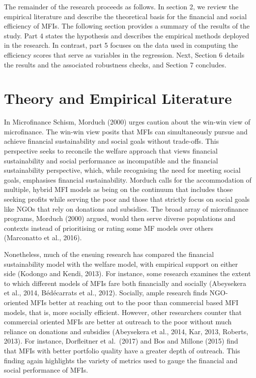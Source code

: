 \documentclass[
]{article}
\begin{document}
The remainder of the research proceeds as follows. In section 2, we
review the empirical literature and describe the theoretical basis for
the financial and social efficiency of MFIs. The following section
provides a summary of the results of the study. Part 4 states the
hypothesis and describes the empirical methods deployed in the research.
In contrast, part 5 focuses on the data used in computing the efficiency
scores that serve as variables in the regression. Next, Section 6
details the results and the associated robustness checks, and Section 7
concludes.

\hypertarget{theory-and-empirical-literature}{%
\section{Theory and Empirical
Literature}\label{theory-and-empirical-literature}}

In Microfinance Schism, Morduch (2000) urges caution about the win-win
view of microfinance. The win-win view posits that MFIs can
simultaneously pursue and achieve financial sustainability and social
goals without trade-offs. This perspective seeks to reconcile the
welfare approach that views financial sustainability and social
performance as incompatible and the financial sustainability
perspective, which, while recognising the need for meeting social goals,
emphasises financial sustainability. Morduch calls for the accommodation
of multiple, hybrid MFI models as being on the continuum that includes
those seeking profits while serving the poor and those that strictly
focus on social goals like NGOs that rely on donations and subsidies.
The broad array of microfinance programs, Morduch (2000) argued, would
then serve diverse populations and contexts instead of prioritising or
rating some MF models over others (Marconatto et al., 2016).

Nonetheless, much of the ensuing research has compared the financial
sustainability model with the welfare model, with empirical support on
either side (Kodongo and Kendi, 2013). For instance, some research
examines the extent to which different models of MFIs fare both
financially and socially (Abeysekera et al., 2014, Bédécarrats et al.,
2012). Socially, ample research finds NGO-oriented MFIs better at
reaching out to the poor than commercial based MFI models, that is, more
socially efficient. However, other researchers counter that commercial
oriented MFIs are better at outreach to the poor without much reliance
on donations and subsidies (Abeysekera et al., 2014, Kar, 2013, Roberts,
2013). For instance, Dorfleitner et al.~(2017) and Bos and Millone
(2015) find that MFIs with better portfolio quality have a greater depth
of outreach. This finding again highlights the variety of metrics used
to gauge the financial and social performance of MFIs.
\end{document}
